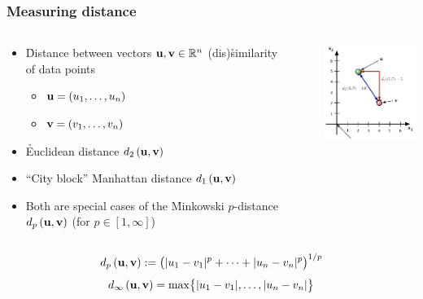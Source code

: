 \begin{frame}
  \frametitle{Measuring distance}

  \begin{columns}[T]
    \begin{column}{60mm}
      \begin{itemize}
      \item \h{Distance} between vectors $\vu, \vv \in \setR^n$ \so
        (dis)\h{similarity}\\ of data points
        \begin{itemize}
        \item $\vu = (u_1, \ldots, u_n)$
        \item $\vv = (v_1, \ldots, v_n)$
        \end{itemize}
      \item \h{Euclidean} distance $\dist[2]{\vu}{\vv}$
      \item ``City block'' \h{Manhattan} distance $\dist[1]{\vu}{\vv}$
      \item Both are special cases of the \h{Minkowski} $p$-distance
        $\dist[p]{\vu}{\vv}$ (for $p\in [1, \infty]$)
      \end{itemize}
    \end{column}
    \begin{column}{40mm}
      \includegraphics[width=40mm]{img/2_distance_examples}
    \end{column}
  \end{columns}
  \gap[.5]
    \[ \dist[p]{\vu}{\vv} \coloneq \bigl(
    \abs{u_1 - v_1}^p + \dots + \abs{u_n - v_n}^p
    \bigr)^{1/p} \] 
    \[ \dist[\infty]{\vu}{\vv} = \max \bigset{\abs{u_1 - v_1}, \ldots, \abs{u_n - v_n}} \] 
\end{frame}


